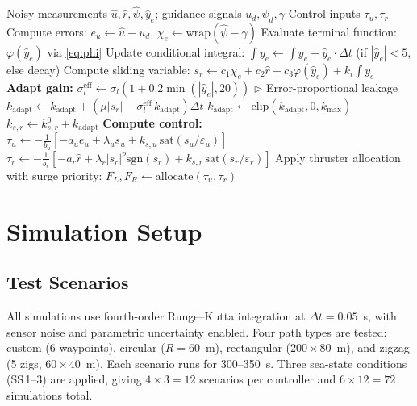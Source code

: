 \documentclass[review]{cas-dc}
\begin{document}
\begin{algorithm}[t]
\caption{ANTSMC control law (one time step)}
\label{alg:antsmc}
\begin{algorithmic}[1]
\Require Noisy measurements $\hat{u}, \hat{r}, \hat{\psi}, \hat{y}_e$; guidance signals $u_d, \psi_d, \gamma$
\Ensure Control inputs $\tau_u, \tau_r$
\State Compute errors: $e_u \gets \hat{u} - u_d$, \quad $\chi_e \gets \mathrm{wrap}(\hat{\psi} - \gamma)$
\State Evaluate terminal function: $\varphi(\hat{y}_e)$ via \eqref{eq:phi}
\State Update conditional integral: $\int y_e \gets \int y_e + \hat{y}_e \cdot \Delta t$ \quad (if $|\hat{y}_e| < 5$, else decay)
\State Compute sliding variable: $s_r \gets c_1 \chi_e + c_2 \hat{r} + c_3 \varphi(\hat{y}_e) + k_i \int y_e$
\State \textbf{Adapt gain:}
\State \quad $\sigma_l^{\mathrm{eff}} \gets \sigma_l(1 + 0.2 \min(|\hat{y}_e|, 20))$ \hfill $\triangleright$ Error-proportional leakage
\State \quad $k_{\mathrm{adapt}} \gets k_{\mathrm{adapt}} + (\mu |s_r| - \sigma_l^{\mathrm{eff}}\, k_{\mathrm{adapt}}) \Delta t$
\State \quad $k_{\mathrm{adapt}} \gets \mathrm{clip}(k_{\mathrm{adapt}}, 0, k_{\max})$
\State \quad $k_{s,r} \gets k_{s,r}^0 + k_{\mathrm{adapt}}$
\State \textbf{Compute control:}
\State \quad $\tau_u \gets -\frac{1}{b_u}[-a_u e_u + \lambda_u s_u + k_{s,u}\,\mathrm{sat}(s_u/\varepsilon_u)]$
\State \quad $\tau_r \gets -\frac{1}{b_r}[-a_r \hat{r} + \lambda_r |s_r|^p \mathrm{sgn}(s_r) + k_{s,r}\,\mathrm{sat}(s_r/\varepsilon_r)]$
\State Apply thruster allocation with surge priority: $F_L, F_R \gets \mathrm{allocate}(\tau_u, \tau_r)$
\end{algorithmic}
\end{algorithm}


\section{Simulation Setup}
\label{sec:setup}

\subsection{Test Scenarios}

All simulations use fourth-order Runge--Kutta integration at $\Delta t = 0.05$~s, with sensor noise and parametric uncertainty enabled. Four path types are tested: custom (6 waypoints), circular ($R = 60$~m), rectangular ($200 \times 80$~m), and zigzag (5 zigs, $60 \times 40$~m). Each scenario runs for 300--350~s. Three sea-state conditions (SS\,1--3) are applied, giving $4 \times 3 = 12$ scenarios per controller and $6 \times 12 = 72$ simulations total.
\end{document}
